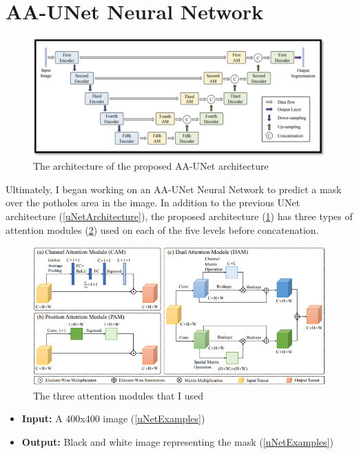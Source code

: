\documentclass[runningheads,a4paper,11pt]{report}
\begin{document}
\newpage
\section{AA-UNet Neural Network}
\label{section:uNet}

\begin{figure}[htbp]
    \centerline{\includegraphics{assets/aAUNetArchitecture.png}}  
    \caption{The architecture of the proposed AA-UNet architecture}
    \label{aAUNetArchitecture}
\end{figure}

Ultimately, I began working on an AA-UNet Neural Network to predict a mask over the potholes area in the image. In addition to the previous UNet architecture (\ref{uNetArchitecture}), the proposed architecture (\ref{aAUNetArchitecture}) has three  types of attention modules (\ref{aAUNetAttentionModules}) used on each of the five levels before concatenation.

\begin{figure}[htbp]
    \centerline{\includegraphics{assets/aAUNetAttentionModules.png}}  
    \caption{The three attention modules that I used}
    \label{aAUNetAttentionModules}
\end{figure}

\newpage
\begin{itemize}
	\item \textbf{Input:} A 400x400 image (\ref{uNetExamples})
	\item \textbf{Output:} Black and white image representing the mask (\ref{uNetExamples})
\end{itemize}
\end{document}
